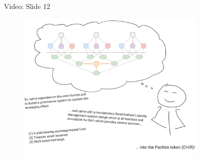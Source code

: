 \documentclass[10pt,xcolor=svgnames]{beamer} %
\begin{document}
\begin{frame}{Video: Slide 12}
\begin{figure}[h!]
\includegraphics[width=3.6in]{img/slide12.png}
\label{fig:dex_forest}
\end{figure}
\end{frame}
\end{document}
